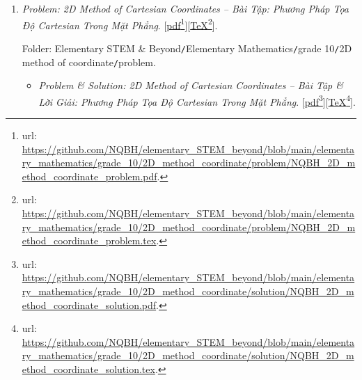 \documentclass[12pt,twoside]{book}
\begin{document}
\begin{enumerate}
	Folder: {\sf Elementary STEM \& Beyond{\tt/}Elementary Mathematics{\tt/}grade 10{\tt/}probability \& statistics{\tt/}problem}.
	\begin{itemize}
		\item {\it Problem \& Solution: Probability \& Statistics -- Bài Tập \& Lời Giải: Xác Suất \& Thống Kê}. [\href{https://github.com/NQBH/elementary_STEM_beyond/blob/main/elementary_mathematics/grade_10/probability_statistics/solution/NQBH_probability_statistics_solution.pdf}{pdf}\footnote{{\sc url}: \url{https://github.com/NQBH/elementary_STEM_beyond/blob/main/elementary_mathematics/grade_10/probability_statistics/solution/NQBH_probability_statistics_solution.pdf}.}][\href{https://github.com/NQBH/elementary_STEM_beyond/blob/main/elementary_mathematics/grade_10/probability_statistics/solution/NQBH_probability_statistics_solution.tex}{\TeX}\footnote{{\sc url}: \url{https://github.com/NQBH/elementary_STEM_beyond/blob/main/elementary_mathematics/grade_10/probability_statistics/solution/NQBH_probability_statistics_solution.tex}.}].
		
		Folder: {\sf Elementary STEM \& Beyond{\tt/}Elementary Mathematics{\tt/}grade 10{\tt/}probability \& statistics{\tt/}solution}.
	\end{itemize}
	\item {\it Problem: 2D Method of Cartesian Coordinates -- Bài Tập: Phương Pháp Tọa Độ Cartesian Trong Mặt Phẳng}. [\href{https://github.com/NQBH/elementary_STEM_beyond/blob/main/elementary_mathematics/grade_10/2D_method_coordinate/problem/NQBH_2D_method_coordinate_problem.pdf}{pdf}\footnote{{\sc url}: \url{https://github.com/NQBH/elementary_STEM_beyond/blob/main/elementary_mathematics/grade_10/2D_method_coordinate/problem/NQBH_2D_method_coordinate_problem.pdf}.}][\href{https://github.com/NQBH/elementary_STEM_beyond/blob/main/elementary_mathematics/grade_10/2D_method_coordinate/problem/NQBH_2D_method_coordinate_problem.tex}{\TeX}\footnote{{\sc url}: \url{https://github.com/NQBH/elementary_STEM_beyond/blob/main/elementary_mathematics/grade_10/2D_method_coordinate/problem/NQBH_2D_method_coordinate_problem.tex}.}].
	
	Folder: {\sf Elementary STEM \& Beyond{\tt/}Elementary Mathematics{\tt/}grade 10{\tt/}2D method of coordinate{\tt/}problem}.
	\begin{itemize}
		\item {\it Problem \& Solution: 2D Method of Cartesian Coordinates -- Bài Tập \& Lời Giải: Phương Pháp Tọa Độ Cartesian Trong Mặt Phẳng}. [\href{https://github.com/NQBH/elementary_STEM_beyond/blob/main/elementary_mathematics/grade_10/2D_method_coordinate/solution/NQBH_2D_method_coordinate_solution.pdf}{pdf}\footnote{{\sc url}: \url{https://github.com/NQBH/elementary_STEM_beyond/blob/main/elementary_mathematics/grade_10/2D_method_coordinate/solution/NQBH_2D_method_coordinate_solution.pdf}.}][\href{https://github.com/NQBH/elementary_STEM_beyond/blob/main/elementary_mathematics/grade_10/2D_method_coordinate/solution/NQBH_2D_method_coordinate_solution.tex}{\TeX}\footnote{{\sc url}: \url{https://github.com/NQBH/elementary_STEM_beyond/blob/main/elementary_mathematics/grade_10/2D_method_coordinate/solution/NQBH_2D_method_coordinate_solution.tex}.}].
		

\end{itemize}
\end{enumerate}
\end{document}
